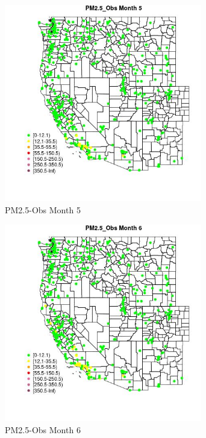 \begin{figure} 
\centering  
\includegraphics[width=0.77\textwidth]{Code_Outputs/ML_input_report_ML_input_PM25_Step5_part_d_de_duplicated_aves_ML_input_MapObsMo5PM25_Obs.jpg} 
\caption{\label{fig:ML_input_report_ML_input_PM25_Step5_part_d_de_duplicated_aves_ML_inputMapObsMo5PM25_Obs}PM2.5-Obs Month 5} 
\end{figure} 
 

\begin{figure} 
\centering  
\includegraphics[width=0.77\textwidth]{Code_Outputs/ML_input_report_ML_input_PM25_Step5_part_d_de_duplicated_aves_ML_input_MapObsMo6PM25_Obs.jpg} 
\caption{\label{fig:ML_input_report_ML_input_PM25_Step5_part_d_de_duplicated_aves_ML_inputMapObsMo6PM25_Obs}PM2.5-Obs Month 6} 
\end{figure} 
 

